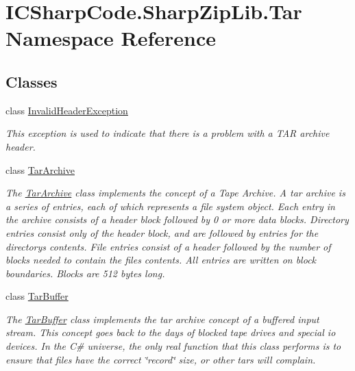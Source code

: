 \hypertarget{namespace_i_c_sharp_code_1_1_sharp_zip_lib_1_1_tar}{}\section{I\+C\+Sharp\+Code.\+Sharp\+Zip\+Lib.\+Tar Namespace Reference}
\label{namespace_i_c_sharp_code_1_1_sharp_zip_lib_1_1_tar}
\subsection*{Classes}
\begin{DoxyCompactItemize}
\item 
class \hyperlink{class_i_c_sharp_code_1_1_sharp_zip_lib_1_1_tar_1_1_invalid_header_exception}{Invalid\+Header\+Exception}
\begin{DoxyCompactList}\small\item\em This exception is used to indicate that there is a problem with a T\+AR archive header. \end{DoxyCompactList}\item 
class \hyperlink{class_i_c_sharp_code_1_1_sharp_zip_lib_1_1_tar_1_1_tar_archive}{Tar\+Archive}
\begin{DoxyCompactList}\small\item\em The \hyperlink{class_i_c_sharp_code_1_1_sharp_zip_lib_1_1_tar_1_1_tar_archive}{Tar\+Archive} class implements the concept of a \textquotesingle{}Tape Archive\textquotesingle{}. A tar archive is a series of entries, each of which represents a file system object. Each entry in the archive consists of a header block followed by 0 or more data blocks. Directory entries consist only of the header block, and are followed by entries for the directory\textquotesingle{}s contents. File entries consist of a header followed by the number of blocks needed to contain the file\textquotesingle{}s contents. All entries are written on block boundaries. Blocks are 512 bytes long. \end{DoxyCompactList}\item 
class \hyperlink{class_i_c_sharp_code_1_1_sharp_zip_lib_1_1_tar_1_1_tar_buffer}{Tar\+Buffer}
\begin{DoxyCompactList}\small\item\em The \hyperlink{class_i_c_sharp_code_1_1_sharp_zip_lib_1_1_tar_1_1_tar_buffer}{Tar\+Buffer} class implements the tar archive concept of a buffered input stream. This concept goes back to the days of blocked tape drives and special io devices. In the C\# universe, the only real function that this class performs is to ensure that files have the correct \char`\"{}record\char`\"{} size, or other tars will complain. \end{DoxyCompactList}\item 

\end{DoxyCompactItemize}
